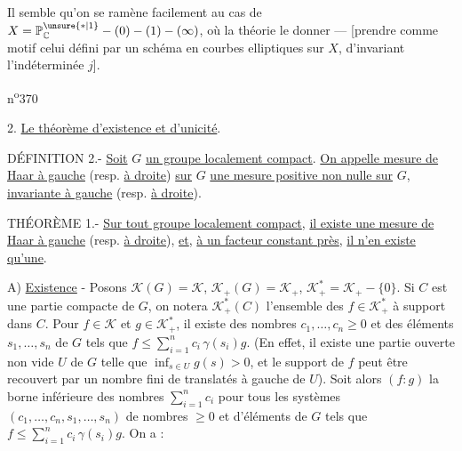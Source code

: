 
Il semble qu'on se ramène facilement au cas de $X=\mathbb{P}^{\unsure{*|1}}_{\mathbb{C}}-(0)-(1)-(\infty)$,  où la théorie   le donner --- [prendre comme motif celui défini par un schéma en courbes elliptiques sur $X$, d'invariant l'indéterminée $j$].

 \hfill n\textsuperscript{o}370

2. \uline{Le théorème d'existence et d'unicité}.


DÉFINITION 2.- \uline{Soit} $G$\handwritten{\unsure{$\checkmark$}} \uline{un groupe localement compact}. \uline{On appelle mesure de Haar à gauche} (resp. \uline{à droite}) \uline{sur} $G$ \uline{une mesure positive non nulle sur} $G$, \uline{invariante à gauche} (resp. \uline{à droite}).

THÉORÈME 1.- \uline{Sur tout groupe localement compact}, \uline{il existe une mesure de Haar à gauche} (resp. \uline{à droite}), \uline{et}, \uline{à un facteur constant près}, \uline{il n'en existe qu'une}.

A) \uline{Existence} - Posons $\mathcal{K}(G)=\mathcal{K}$, $\mathcal{K}_+(G)=\mathcal{K}_+$, $\mathcal{K}_+^*=\mathcal{K}_+-\{0\}$. Si $C$ est une partie compacte de $G$, on notera $\mathcal{K}_+^*(C)$ l'ensemble des $f\in\mathcal{K}_+^*$ à support dans $C$. Pour $f\in\mathcal{K}$ et $g\in\mathcal{K}_+^*$, il existe des nombres $c_1,\ldots,c_n\geq0$ et des éléments $s_1,\ldots,s_n$ de $G$ tels que $f\leq\sum\limits_{i=1}^n c_i\,\gamma(s_i)g$. (En effet, il existe une partie ouverte non vide $U$ de $G$ telle que $\inf_{s\in U}g(s)>0$, et le support de $f$ peut être recouvert par un nombre fini de translatés à gauche de $U$). Soit alors $(f:g)$ la borne inférieure des nombres $\sum\limits_{i=1}^n c_i$ pour tous les systèmes $(c_1,\ldots,c_n,s_1,\ldots,s_n)$ de nombres $\geq0$ et d'éléments de $G$ tels que $f\leq\sum\limits_{i=1}^n c_i\,\gamma(s_i)g$. On a :

